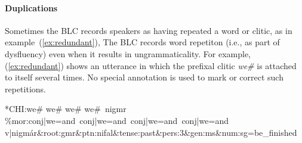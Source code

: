 \paragraph{Duplications}
Sometimes the BLC records speakers as having repeated a word or clitic, as in example~(\ref{ex:redundant}),
The BLC records word repetiton (i.e., as part of dysfluency) even when it results in ungrammaticality.
For example, (\ref{ex:redundant}) shows an utterance in which the prefixal clitic \textit{we\#} is 
attached to itself several times. No special annotation is used to mark or correct such repetitions. 
\begin{exe} 
\ex \label{ex:redundant} \textsf{*CHI:\quad we\# we\# we\# we\#\, nigmr } \\
   \textsf{\%mor:\quad conj|we=and\, conj|we=and\, conj|we=and\, conj|we=and} \\
   \textsf{v|nigm\'ar\&root:gmr\&ptn:nifal\&tense:past\&pers:3\&gen:ms\&num:sg=be\_finished }
\end{exe}

 
